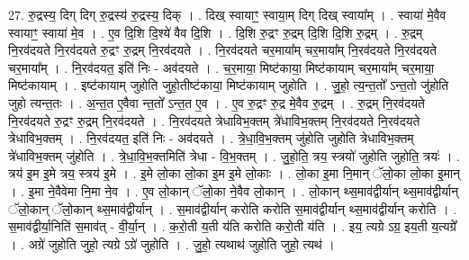 \documentclass[17pt]{extarticle}
\begin{document}
27. रु॒द्रस्य॒ दिग् दिग् रु॒द्रस्य॑ रु॒द्रस्य॒ दिक् । . दिख् स्वायाꣳ॒॒ स्वाया॒म् दिग् दिख् स्वाया᳚म् । . स्वाया॑ मे॒वैव स्वायाꣳ॒॒ स्वाया॑ मे॒व । . ए॒व दि॒शि दि॒श्ये॑ वैव दि॒शि । . दि॒शि रु॒द्रꣳ रु॒द्रम् दि॒शि दि॒शि रु॒द्रम् । . रु॒द्रम् नि॒रव॑दयते नि॒रव॑दयते रु॒द्रꣳ रु॒द्रम् नि॒रव॑दयते । . नि॒रव॑दयते चर॒माया᳚म् चर॒माया᳚म् नि॒रव॑दयते नि॒रव॑दयते चर॒माया᳚म् । . नि॒रव॑दयत॒ इति॑ निः - अव॑दयते । . च॒र॒माया॒ मिष्ट॑काया॒ मिष्ट॑कायाम् चर॒माया᳚म् चर॒माया॒ मिष्ट॑कायाम् । . इष्ट॑कायाम् जुहोति जुहो॒तीष्ट॑काया॒ मिष्ट॑कायाम् जुहोति । . जु॒हो॒ त्य॒न्त॒तो᳚ ऽन्त॒तो जु॑होति जुहो त्यन्त॒तः । . अ॒न्त॒त ए॒वैवा न्त॒तो᳚ ऽन्त॒त ए॒व । . ए॒व रु॒द्रꣳ रु॒द्र मे॒वैव रु॒द्रम् । . रु॒द्रम् नि॒रव॑दयते नि॒रव॑दयते रु॒द्रꣳ रु॒द्रम् नि॒रव॑दयते । . नि॒रव॑दयते त्रेधाविभ॒क्तम् त्रे॑धाविभ॒क्तम् नि॒रव॑दयते नि॒रव॑दयते त्रेधाविभ॒क्तम् । . नि॒रव॑दयत॒ इति॑ निः - अव॑दयते । . त्रे॒धा॒वि॒भ॒क्तम् जु॑होति जुहोति त्रेधाविभ॒क्तम् त्रे॑धाविभ॒क्तम् जु॑होति । . त्रे॒धा॒वि॒भ॒क्तमिति॑ त्रेधा - वि॒भ॒क्तम् । . जु॒हो॒ति॒ त्रय॒ स्त्रयो॑ जुहोति जुहोति॒ त्रयः॑ । . त्रय॑ इ॒म इ॒मे त्रय॒ स्त्रय॑ इ॒मे । . इ॒मे लो॒का लो॒का इ॒म इ॒मे लो॒काः । . लो॒का इ॒मा नि॒मान् ॅलो॒का लो॒का इ॒मान् । . इ॒मा ने॒वैवेमा नि॒मा ने॒व । . ए॒व लो॒कान् ॅलो॒का ने॒वैव लो॒कान् । . लो॒कान् थ्स॒माव॑द्वीर्यान् थ्स॒माव॑द्वीर्यान् ॅलो॒कान् ॅलो॒कान् थ्स॒माव॑द्वीर्यान् । . स॒माव॑द्वीर्यान् करोति करोति स॒माव॑द्वीर्यान् थ्स॒माव॑द्वीर्यान् करोति । . स॒माव॑द्वीर्या॒निति॑ स॒माव॑त् - वी॒र्या॒न् । . क॒रो॒ती य॒ती य॑ति करोति करो॒ती य॑ति । . इय॒ त्यग्रे ऽग्र॒ इय॒ती य॒त्यग्रे᳚ । . अग्रे॑ जुहोति जुहो॒ त्यग्रे ऽग्रे॑ जुहोति । . जु॒हो॒ त्यथाथ॑ जुहोति जुहो॒ त्यथ॑ । \newline
\end{document}
